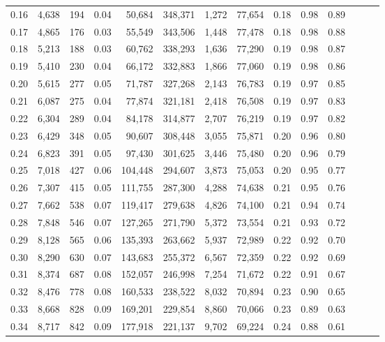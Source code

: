 \begin{tabular}{rrrrrrrrrrrrrr}
0.16 &  4,638 &    194 &  0.04 &   50,684 &  348,371 &   1,272 &  77,654 &  0.18 &  0.98 &      0.89 \\
0.17 &  4,865 &    176 &  0.03 &   55,549 &  343,506 &   1,448 &  77,478 &  0.18 &  0.98 &      0.88 \\
0.18 &  5,213 &    188 &  0.03 &   60,762 &  338,293 &   1,636 &  77,290 &  0.19 &  0.98 &      0.87 \\
0.19 &  5,410 &    230 &  0.04 &   66,172 &  332,883 &   1,866 &  77,060 &  0.19 &  0.98 &      0.86 \\
0.20 &  5,615 &    277 &  0.05 &   71,787 &  327,268 &   2,143 &  76,783 &  0.19 &  0.97 &      0.85 \\
0.21 &  6,087 &    275 &  0.04 &   77,874 &  321,181 &   2,418 &  76,508 &  0.19 &  0.97 &      0.83 \\
0.22 &  6,304 &    289 &  0.04 &   84,178 &  314,877 &   2,707 &  76,219 &  0.19 &  0.97 &      0.82 \\
0.23 &  6,429 &    348 &  0.05 &   90,607 &  308,448 &   3,055 &  75,871 &  0.20 &  0.96 &      0.80 \\
0.24 &  6,823 &    391 &  0.05 &   97,430 &  301,625 &   3,446 &  75,480 &  0.20 &  0.96 &      0.79 \\
0.25 &  7,018 &    427 &  0.06 &  104,448 &  294,607 &   3,873 &  75,053 &  0.20 &  0.95 &      0.77 \\
0.26 &  7,307 &    415 &  0.05 &  111,755 &  287,300 &   4,288 &  74,638 &  0.21 &  0.95 &      0.76 \\
0.27 &  7,662 &    538 &  0.07 &  119,417 &  279,638 &   4,826 &  74,100 &  0.21 &  0.94 &      0.74 \\
0.28 &  7,848 &    546 &  0.07 &  127,265 &  271,790 &   5,372 &  73,554 &  0.21 &  0.93 &      0.72 \\
0.29 &  8,128 &    565 &  0.06 &  135,393 &  263,662 &   5,937 &  72,989 &  0.22 &  0.92 &      0.70 \\
0.30 &  8,290 &    630 &  0.07 &  143,683 &  255,372 &   6,567 &  72,359 &  0.22 &  0.92 &      0.69 \\
0.31 &  8,374 &    687 &  0.08 &  152,057 &  246,998 &   7,254 &  71,672 &  0.22 &  0.91 &      0.67 \\
0.32 &  8,476 &    778 &  0.08 &  160,533 &  238,522 &   8,032 &  70,894 &  0.23 &  0.90 &      0.65 \\
0.33 &  8,668 &    828 &  0.09 &  169,201 &  229,854 &   8,860 &  70,066 &  0.23 &  0.89 &      0.63 \\
0.34 &  8,717 &    842 &  0.09 &  177,918 &  221,137 &   9,702 &  69,224 &  0.24 &  0.88 &      0.61 \\

\end{tabular}
